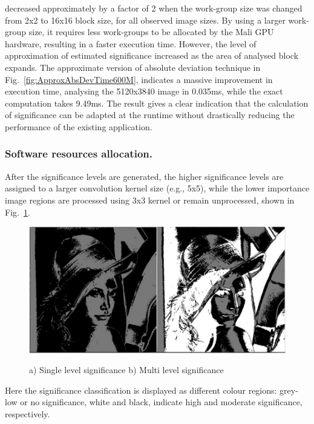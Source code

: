 \documentclass[journal]{IEEEtran}
\begin{document}
decreased approximately by a factor of 2 when the work-group size was changed from 2x2 to 16x16 block size, for all observed image sizes. By using a larger work-group size, it requires less work-groups to be allocated by the Mali GPU hardware, resulting in a faster execution time. However, the level of approximation of estimated significance increased as the area of analysed block expands. The approximate version of absolute deviation technique in Fig.~\ref{fig:ApproxAbsDevTime600M}, indicates a massive improvement in execution time, analysing the 5120x3840 image in 0.035ms, while the exact computation takes 9.49ms. The result gives a clear indication that the calculation of significance can be adapted at the runtime without drastically reducing the performance of the existing application. 
\subsubsection{Software resources allocation.}
 After the significance levels are generated, the higher significance levels are assigned to a larger convolution kernel size (e.g., 5x5), while the lower importance image regions are processed using 3x3 kernel or remain unprocessed, shown in Fig.~\ref{fig:LenaPair}.
 \begin{figure}[htbp]
  \centering
    \caption{a) Single level significance    b) Multi level significance   }
    \includegraphics[width=\columnwidth]{OdroidLena.jpg}
  \label{fig:LenaPair}
\end{figure}
Here the significance classification is displayed as different colour regions: grey-low or no significance, white and black, indicate high and moderate significance, respectively.
\end{document}
